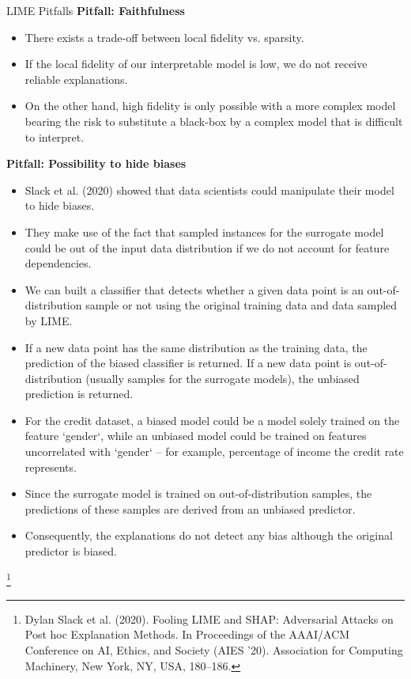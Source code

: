 \documentclass[11pt,compress,t,notes=noshow, xcolor=table]{beamer}
\begin{document}
\begin{vbframe}{LIME Pitfalls}
\textbf{Pitfall: Faithfulness}
\begin{itemize}
	\item There exists a trade-off between local fidelity vs. sparsity. 
	\item If the local fidelity of our interpretable model is low, we do not receive reliable explanations.
	\item On the other hand, high fidelity is only possible with a more complex model bearing the risk to substitute a black-box by a complex model that is difficult to interpret.
\end{itemize}
\framebreak

\textbf{Pitfall: Possibility to hide biases}
\begin{itemize}
	\item Slack et al. (2020) showed that data scientists could manipulate their model to hide biases. 
	\item They make use of the fact that sampled instances for the surrogate model could be out of the input data distribution if we do not account for feature dependencies. 
	\item We can built a classifier that detects whether a given data point is an out-of-distribution sample or not using the original training data and data sampled by LIME. 
	\item If a new data point has the same distribution as the training data, the prediction of the biased classifier is returned. If a new data point is out-of-distribution (usually samples for the surrogate models), the unbiased prediction is returned.
	\item For the credit dataset, a biased model could be a model solely trained on the feature `gender`, while an unbiased model could be trained on features uncorrelated with `gender` -- for example, percentage of income the credit rate represents.   
	\item Since the surrogate model is trained on out-of-distribution samples, the predictions of these samples are derived from an unbiased predictor. 
	\item Consequently, the explanations do not detect any bias although the original predictor is biased. 
\end{itemize}
\footnote[frame]{Dylan Slack et al. (2020). Fooling LIME and SHAP: Adversarial Attacks on Post hoc Explanation Methods. In Proceedings of the AAAI/ACM Conference on AI, Ethics, and Society (AIES '20). Association for Computing Machinery, New York, NY, USA, 180–186.}
\end{vbframe}
\end{document}
